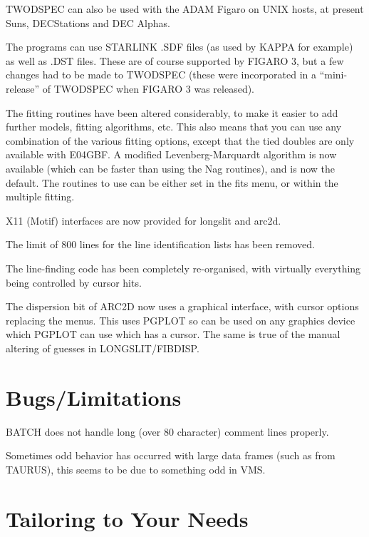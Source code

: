 \begin{list}{()}{}
\item
TWODSPEC can also be used with the ADAM Figaro on UNIX  hosts, at
present Suns, DECStations and DEC Alphas.

\item
The programs can use STARLINK .SDF files (as used by KAPPA
for example) as well as .DST files.
These are of course supported by FIGARO 3, but a few changes had to be
made to TWODSPEC (these were incorporated in a ``mini-release'' of
TWODSPEC when FIGARO 3 was released).

\item
The fitting routines have been altered considerably, to make it easier
to add further models, fitting algorithms, etc.
This also means that you can use any combination of the various fitting
options, except that the tied doubles are only available with E04GBF.
A modified Levenberg-Marquardt algorithm is now available (which can be
faster than using the Nag routines), and is now the default.
The routines to use can be either set in the fits menu, or within the
multiple fitting.

\item
X11 (Motif) interfaces are now provided for longslit and arc2d.

\item
The limit of 800 lines for the line identification lists has been removed.

\item
The line-finding code has been completely re-organised, with virtually
everything being controlled by cursor hits.

\item
The dispersion bit of ARC2D now uses a graphical interface, with
cursor options replacing the menus. This uses PGPLOT so can be used on
any graphics device which PGPLOT can use which has a cursor. The same
is true of the manual altering of guesses in LONGSLIT/FIBDISP.
\end{list}

\section{Bugs/Limitations}

BATCH does not handle long (over 80 character) comment lines properly.

Sometimes odd behavior has occurred with large data frames (such as from
TAURUS), this seems to be due to something odd in VMS.

\section{Tailoring to Your Needs}

